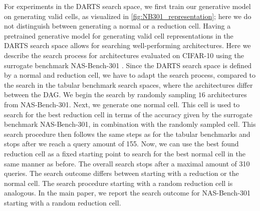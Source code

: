 \documentclass[runningheads]{llncs}
\begin{document}
For experiments in the DARTS \cite{2018DARTS} search space, we first train our generative model on generating valid cells, as visualized in \autoref{fig:NB301_representation}; here we do not distinguish between generating a normal or a reduction cell. Having a pretrained generative model for generating valid cell representations in the DARTS search space allows for searching well-performing architectures.
Here we describe the search process for architectures evaluated on CIFAR-10 using the surrogate benchmark NAS-Bench-301 \cite{2020NB301}. Since the DARTS search space is defined by a normal and reduction cell, we have to adapt the search process, compared to the search in the tabular benchmark search spaces, where the architectures differ between the DAG. We begin the search by randomly sampling $16$ architectures from NAS-Bench-301. Next, we generate one normal cell.
This cell is used to search for the best reduction cell in terms of the accuracy given by the surrogate benchmark NAS-Bench-301, in combination with the randomly sampled cell.
This search procedure then follows the same steps as for the tabular benchmarks and stops after we reach a query amount of 155.
Now, we can use the best found reduction cell as a fixed starting point to search for the best normal cell in the same manner as before.
The overall search stops after a maximal amount of 310 queries.
The search outcome differs between starting with a reduction or the normal cell.
The search procedure starting with a random reduction cell is analogous.
In the main paper, we report the search outcome for NAS-Bench-301 \cite{2020NB301} starting with a random reduction cell.
\end{document}
